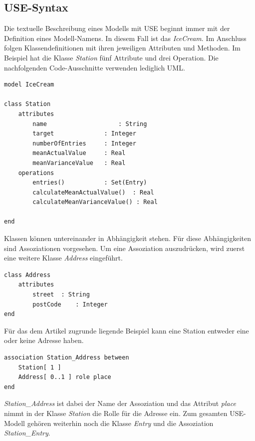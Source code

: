 \documentclass[a4paper,twoside]{article}
\begin{document}
\subsection{USE-Syntax} 
\label{ssec:specification}

Die textuelle Beschreibung eines Modells mit USE beginnt immer mit der Definition eines Modell-Namens. In diesem Fall ist das \textit{IceCream}. Im Anschluss folgen Klassendefinitionen mit ihren jeweiligen Attributen und Methoden. Im Beispiel hat die Klasse \textit{Station} fünf Attribute und drei Operation. Die nachfolgenden Code-Ausschnitte verwenden lediglich UML.

\lstset{basicstyle=\tiny,style=myCustomUseStyle}
\begin{lstlisting}[caption={USE-Spezifikation der Klasse Station im Modell IceCream},label=lst:use1]
model IceCream

class Station
	attributes
		name					: String
		target				: Integer
		numberOfEntries 	: Integer
		meanActualValue 	: Real 
		meanVarianceValue	: Real
	operations
		entries()			: Set(Entry) 
		calculateMeanActualValue()	: Real
		calculateMeanVarianceValue() : Real
		
end
\end{lstlisting}

Klassen können untereinander in Abhängigkeit stehen. Für diese Abhängigkeiten sind Assoziationen vorgesehen. Um eine Assoziation auszudrücken, wird zuerst eine weitere Klasse \textit{Address} eingeführt.

\begin{lstlisting}[caption={USE-Spezifikation der Klasse Adresse},label=lst:use2]
class Address
	attributes
		street	: String
		postCode	: Integer
end
\end{lstlisting}

Für das dem Artikel zugrunde liegende Beispiel kann eine Station entweder eine oder keine Adresse haben.

\begin{lstlisting}[caption={USE-Spezifikation der Assoziation zwischen einer Station und einer Adresse},label=lst:assocs1]
association Station_Address between
	Station[ 1 ] 
	Address[ 0..1 ] role place
end
\end{lstlisting}

\textit{Station\_Address} ist dabei der Name der Assoziation und das Attribut \textit{place} nimmt in der Klasse \textit{Station} die Rolle für die Adresse ein. Zum gesamten USE-Modell gehören weiterhin noch die Klasse \textit{Entry} und die Assoziation \textit{Station\_Entry}.
\end{document}
